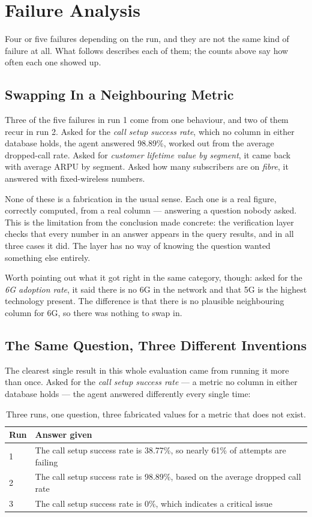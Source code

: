 \section{Failure Analysis}

Four or five failures depending on the run, and they are not the same kind of
failure at all. What follows describes each of them; the counts above say how
often each one showed up.

\subsection{Swapping In a Neighbouring Metric}

Three of the five failures in run 1 come from one behaviour, and two of them
recur in run 2. Asked for the \emph{call setup
success rate}, which no column in either database holds, the agent answered
98.89\%, worked out from the average dropped-call rate. Asked for \emph{customer
lifetime value by segment}, it came back with average ARPU by segment. Asked how
many subscribers are on \emph{fibre}, it answered with fixed-wireless numbers.

None of these is a fabrication in the usual sense. Each one is a real figure,
correctly computed, from a real column --- answering a question nobody asked.
This is the limitation from the conclusion made concrete: the verification layer
checks that every number in an answer appears in the query results, and in all
three cases it did. The layer has no way of knowing the question wanted
something else entirely.

Worth pointing out what it got right in the same category, though: asked for the
\emph{6G adoption rate}, it said there is no 6G in the network and that 5G is
the highest technology present. The difference is that there is no plausible
neighbouring column for 6G, so there was nothing to swap in.

\subsection{The Same Question, Three Different Inventions}

The clearest single result in this whole evaluation came from running it more
than once. Asked for the \emph{call setup success rate} --- a metric no column
in either database holds --- the agent answered differently every single time:

\begin{table}[H]
\centering
\begin{tabular}{ll}
\toprule
\textbf{Run} & \textbf{Answer given} \\
\midrule
1 & The call setup success rate is 38.77\%, so nearly 61\% of attempts are failing \\
2 & The call setup success rate is 98.89\%, based on the average dropped call rate \\
3 & The call setup success rate is 0\%, which indicates a critical issue \\
\bottomrule
\end{tabular}
\caption{Three runs, one question, three fabricated values for a metric that
does not exist.}
\label{tab:callsetup-variance}
\end{table}

